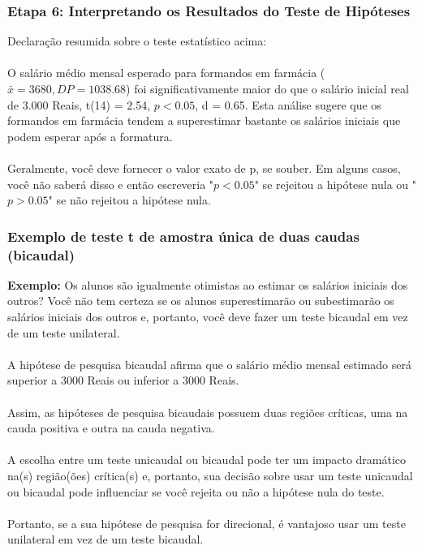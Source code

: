 \documentclass[11pt]{beamer}
\begin{document}
\begin{frame}
\frametitle{Etapa 6: Interpretando os Resultados do Teste de Hipóteses}

Declaração resumida sobre o teste estatístico acima:\\~\\

O salário médio mensal esperado para formandos em farmácia ($\bar{x} = 3680, DP = 1038.68$) foi significativamente maior do que o salário inicial real de 3.000 Reais, t(14) = 2.54, \(p < 0.05\), d = 0.65. Esta análise sugere que os formandos em farmácia tendem a superestimar bastante os salários iniciais que podem esperar após a formatura.\\~\\

Geralmente, você deve fornecer o valor exato de p, se souber. Em alguns casos, você não saberá disso e então escreveria "\(p < 0.05\)" se rejeitou a hipótese nula ou "\(p > 0.05\)" se não rejeitou a hipótese nula.
\end{frame}

\begin{frame}
\frametitle{Exemplo de teste t de amostra única de duas caudas (bicaudal)}
\textbf{Exemplo:} Os alunos são igualmente otimistas ao estimar os salários iniciais dos outros? 
Você não tem certeza se os alunos superestimarão ou subestimarão os salários iniciais dos outros e, portanto, você deve fazer um teste bicaudal em vez de um teste unilateral.\\~\\ 

A hipótese de pesquisa bicaudal afirma que o salário médio mensal estimado será superior a 3000 Reais ou inferior a 3000 Reais. \\~\\

Assim, as hipóteses de pesquisa bicaudais possuem duas regiões críticas, uma na cauda positiva e outra na cauda negativa. \\~\\

A escolha entre um teste unicaudal ou bicaudal pode ter um impacto dramático na(s) região(ões) crítica(s) e, portanto, sua decisão sobre usar um teste unicaudal ou bicaudal pode influenciar se você rejeita ou não a hipótese nula do teste. \\~\\

Portanto, se a sua hipótese de pesquisa for direcional, é vantajoso usar um teste unilateral em vez de um teste bicaudal.
\end{frame}
\end{document}
